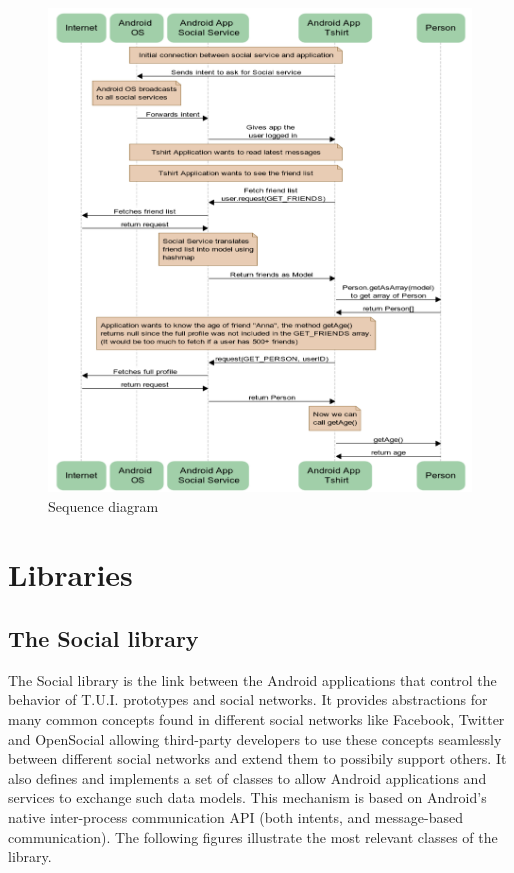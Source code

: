 \begin{figure}[h!]
	\centering \includegraphics[width=1.0\textwidth]{img/design-sequence.png}
	\caption{Sequence diagram}
	\label{fig:design-sequence}
\end{figure}


\section{Libraries}

\subsection{The Social library}
The Social library is the link between the Android applications that control the
behavior of T.U.I. prototypes and social networks. It provides abstractions for
many common concepts found in different social networks like Facebook, Twitter
and OpenSocial allowing third-party developers to use these concepts seamlessly
between different social networks and extend them to possibily support others.
It also defines and implements a set of classes to allow Android applications
and services to exchange such data models. This mechanism is based on Android's
native inter-process communication API (both intents, and message-based \newline
communication). The following figures illustrate the most relevant classes
of the library.

